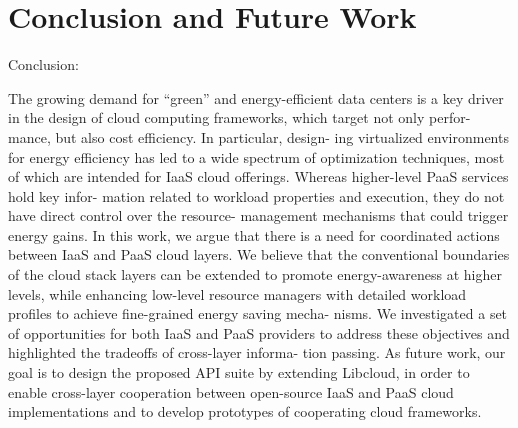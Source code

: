 \section{Conclusion and Future Work}
\label{sec: conclusion}

Conclusion:

The growing demand for “green” and energy-efficient
data centers is a key driver in the design of cloud
computing frameworks, which target not only perfor-
mance, but also cost efficiency. In particular, design-
ing virtualized environments for energy efficiency has
led to a wide spectrum of optimization techniques,
most of which are intended for IaaS cloud offerings.
Whereas higher-level PaaS services hold key infor-
mation related to workload properties and execution,
they do not have direct control over the resource-
management mechanisms that could trigger energy
gains. In this work, we argue that there is a need
for coordinated actions between IaaS and PaaS cloud
layers. We believe that the conventional boundaries
of the cloud stack layers can be extended to promote
energy-awareness at higher levels, while enhancing
low-level resource managers with detailed workload
profiles to achieve fine-grained energy saving mecha-
nisms.
We investigated a set of opportunities for both
IaaS and PaaS providers to address these objectives
and highlighted the tradeoffs of cross-layer informa-
tion passing. As future work, our goal is to design the
proposed API suite by extending Libcloud, in order to
enable cross-layer cooperation between open-source
IaaS and PaaS cloud implementations and to develop
prototypes of cooperating cloud frameworks.
